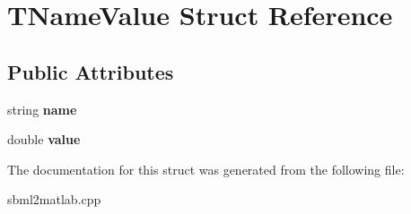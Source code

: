 \hypertarget{struct_t_name_value}{\section{T\-Name\-Value Struct Reference}
\label{struct_t_name_value}
}
\subsection*{Public Attributes}
\begin{DoxyCompactItemize}
\item 
\hypertarget{struct_t_name_value_acf5d7db86bc057ec60d6e0544a3ff780}{string {\bfseries name}}\label{struct_t_name_value_acf5d7db86bc057ec60d6e0544a3ff780}

\item 
\hypertarget{struct_t_name_value_a17ffb7fca2db1fc5569e3127e4cd47ea}{double {\bfseries value}}\label{struct_t_name_value_a17ffb7fca2db1fc5569e3127e4cd47ea}

\end{DoxyCompactItemize}


The documentation for this struct was generated from the following file\-:\begin{DoxyCompactItemize}
\item 
sbml2matlab.\-cpp\end{DoxyCompactItemize}
